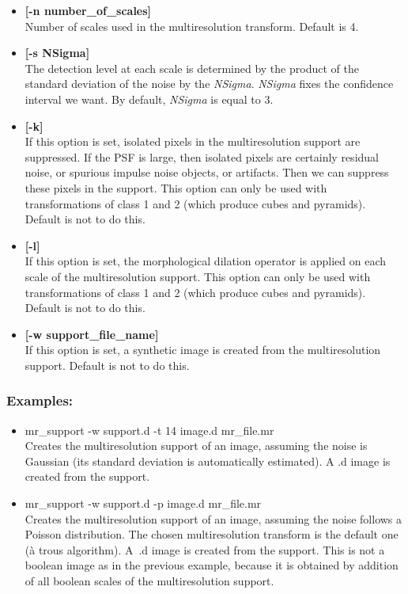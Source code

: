 \begin{itemize}
\item {\bf [-n number\_of\_scales]} \\
Number of scales used in the multiresolution transform. Default is 4.
\item {\bf [-s NSigma]} \\
The detection level at each scale is determined by the product
of the standard deviation of the noise by the {\em NSigma}.
{\em NSigma} fixes the confidence interval we want. By default,
{\em NSigma} is equal to 3.
\item {\bf [-k]} \\
If this option is set, isolated pixels in the multiresolution support
are suppressed. If the PSF is large, then isolated pixels are 
certainly residual noise, or spurious impulse noise objects,  
or artifacts. Then
we can suppress these pixels in the support. This option
can only be used with transformations of class 1 and 2 (which
produce cubes and pyramids). Default is not to do this.
\item {\bf [-l]} \\
If this option is set, the morphological dilation operator is
applied on each scale of the multiresolution support. This option
can only be used with transformations of class 1 and 2 (which
produce cubes and pyramids). Default is not to do this.
\item {\bf [-w support\_file\_name]} \\
 If this option is set, a synthetic image is created from the 
multiresolution support. Default is not to do this.
\end{itemize}                 
\subsubsection*{Examples:}
\begin{itemize}
\item mr\_support -w support.d -t 14 image.d  mr\_file.mr  \\
Creates the multiresolution support of an image, assuming the noise is
Gaussian (its standard deviation is automatically estimated). A .d image
is created from the support.
\item mr\_support -w support.d -p image.d  mr\_file.mr  \\
Creates the multiresolution support  of an image, assuming the noise follows
a Poisson distribution. The chosen multiresolution transform 
is the default one 
(\`a trous algorithm). A~.d image is created from the support. This is not
a boolean image as in the previous example, because it is obtained by
addition of all boolean scales of the multiresolution support.
\end{itemize}


